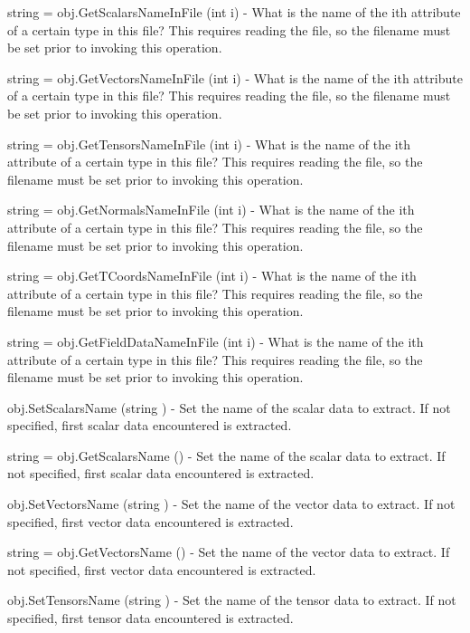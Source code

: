\begin{DoxyItemize}
\item {\ttfamily string = obj.\-Get\-Scalars\-Name\-In\-File (int i)} -\/ What is the name of the ith attribute of a certain type in this file? This requires reading the file, so the filename must be set prior to invoking this operation.  
\item {\ttfamily string = obj.\-Get\-Vectors\-Name\-In\-File (int i)} -\/ What is the name of the ith attribute of a certain type in this file? This requires reading the file, so the filename must be set prior to invoking this operation.  
\item {\ttfamily string = obj.\-Get\-Tensors\-Name\-In\-File (int i)} -\/ What is the name of the ith attribute of a certain type in this file? This requires reading the file, so the filename must be set prior to invoking this operation.  
\item {\ttfamily string = obj.\-Get\-Normals\-Name\-In\-File (int i)} -\/ What is the name of the ith attribute of a certain type in this file? This requires reading the file, so the filename must be set prior to invoking this operation.  
\item {\ttfamily string = obj.\-Get\-T\-Coords\-Name\-In\-File (int i)} -\/ What is the name of the ith attribute of a certain type in this file? This requires reading the file, so the filename must be set prior to invoking this operation.  
\item {\ttfamily string = obj.\-Get\-Field\-Data\-Name\-In\-File (int i)} -\/ What is the name of the ith attribute of a certain type in this file? This requires reading the file, so the filename must be set prior to invoking this operation.  
\item {\ttfamily obj.\-Set\-Scalars\-Name (string )} -\/ Set the name of the scalar data to extract. If not specified, first scalar data encountered is extracted.  
\item {\ttfamily string = obj.\-Get\-Scalars\-Name ()} -\/ Set the name of the scalar data to extract. If not specified, first scalar data encountered is extracted.  
\item {\ttfamily obj.\-Set\-Vectors\-Name (string )} -\/ Set the name of the vector data to extract. If not specified, first vector data encountered is extracted.  
\item {\ttfamily string = obj.\-Get\-Vectors\-Name ()} -\/ Set the name of the vector data to extract. If not specified, first vector data encountered is extracted.  
\item {\ttfamily obj.\-Set\-Tensors\-Name (string )} -\/ Set the name of the tensor data to extract. If not specified, first tensor data encountered is extracted.  

\end{DoxyItemize}

